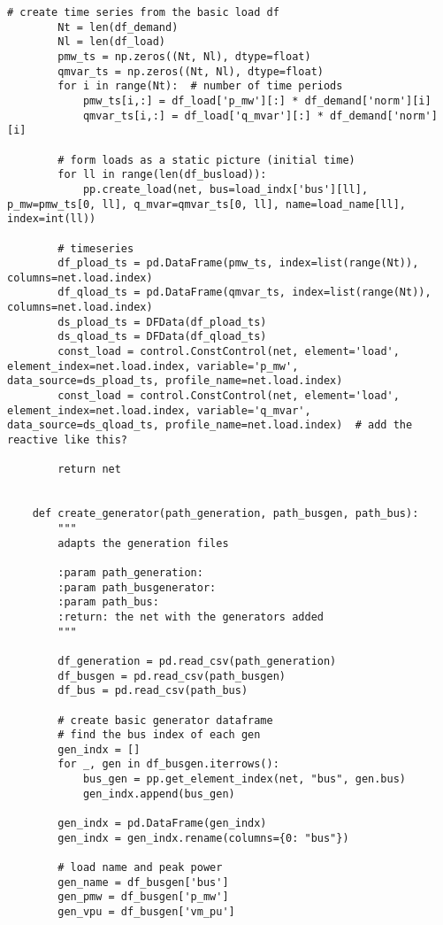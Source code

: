 \begin{lstlisting}[caption={Main code in Python with the Pandapower library}]
        # create time series from the basic load df
        Nt = len(df_demand)
        Nl = len(df_load)
        pmw_ts = np.zeros((Nt, Nl), dtype=float)
        qmvar_ts = np.zeros((Nt, Nl), dtype=float)
        for i in range(Nt):  # number of time periods
            pmw_ts[i,:] = df_load['p_mw'][:] * df_demand['norm'][i]
            qmvar_ts[i,:] = df_load['q_mvar'][:] * df_demand['norm'][i]

        # form loads as a static picture (initial time)
        for ll in range(len(df_busload)):
            pp.create_load(net, bus=load_indx['bus'][ll], p_mw=pmw_ts[0, ll], q_mvar=qmvar_ts[0, ll], name=load_name[ll], index=int(ll))

        # timeseries
        df_pload_ts = pd.DataFrame(pmw_ts, index=list(range(Nt)), columns=net.load.index)
        df_qload_ts = pd.DataFrame(qmvar_ts, index=list(range(Nt)), columns=net.load.index)
        ds_pload_ts = DFData(df_pload_ts)
        ds_qload_ts = DFData(df_qload_ts)
        const_load = control.ConstControl(net, element='load', element_index=net.load.index, variable='p_mw', data_source=ds_pload_ts, profile_name=net.load.index)
        const_load = control.ConstControl(net, element='load', element_index=net.load.index, variable='q_mvar', data_source=ds_qload_ts, profile_name=net.load.index)  # add the reactive like this?

        return net


    def create_generator(path_generation, path_busgen, path_bus):
        """
        adapts the generation files

        :param path_generation:
        :param path_busgenerator:
        :param path_bus:
        :return: the net with the generators added
        """

        df_generation = pd.read_csv(path_generation)
        df_busgen = pd.read_csv(path_busgen)
        df_bus = pd.read_csv(path_bus)

        # create basic generator dataframe
        # find the bus index of each gen
        gen_indx = []
        for _, gen in df_busgen.iterrows():
            bus_gen = pp.get_element_index(net, "bus", gen.bus)
            gen_indx.append(bus_gen)

        gen_indx = pd.DataFrame(gen_indx)
        gen_indx = gen_indx.rename(columns={0: "bus"})

        # load name and peak power
        gen_name = df_busgen['bus']
        gen_pmw = df_busgen['p_mw']
        gen_vpu = df_busgen['vm_pu']


\end{lstlisting}
